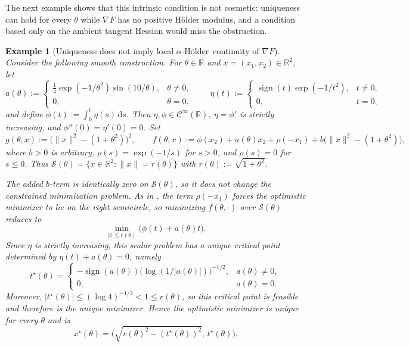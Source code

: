 \documentclass{article}
\theoremstyle{normaltheorem}
\newtheorem{example}[example]{Example}
\newcommand{\R}{\mathbb{R}}
\newcommand{\calS}{\mathcal{S}}
\newcommand{\holder}{{H\"older}}
\begin{document}
The next example shows that this intrinsic condition is not cosmetic: uniqueness can hold for every \(\theta\) while
\(\nabla F\) has no positive H\"older modulus, and a condition based only on the ambient tangent Hessian would miss the
obstruction.

\begin{example}[Uniqueness does not imply local \texorpdfstring{$\alpha$}{alpha}-\holder\ continuity of $\nabla F$]\label{ex:unique-nonsmooth}
Consider the following smooth construction. For $\theta\in\R$ and $x=(x_1,x_2)\in\R^2$, let
\[
a(\theta):=
\begin{cases}
\frac14 \exp({-1/\theta^2})\sin(10/\theta), & \theta\neq 0,\\
0, & \theta=0,
\end{cases}
\qquad
\eta(t):=
\begin{cases}
\operatorname{sign}(t)\exp({-1/t^2}), & t\neq 0,\\
0, & t=0,
\end{cases}
\]
and define $\phi(t):=\int_0^t \eta(s)\,\mathrm ds$. Then $\eta,\phi\in\mathcal{C}^{\infty}(\R)$, $\eta=\phi'$ is strictly increasing, and $\phi''(0)=\eta'(0)=0$. Set
\[
g(\theta,x):=\big(\|x\|^2-(1+\theta^2)\big)^2,
\qquad
f(\theta,x):=\phi(x_2)+a(\theta)x_2+\rho(-x_1)+b\big(\|x\|^2-(1+\theta^2)\big),
\]
where \(b>0\) is arbitrary, $\rho(s)=\exp({-1/s})$ for $s>0$, and $\rho(s)=0$ for $s\le 0$. Thus $\calS(\theta)=\{x\in\R^2:\|x\|=r(\theta)\}$ with $r(\theta):=\sqrt{1+\theta^2}$.

The added \(b\)-term is identically zero on \(\calS(\theta)\), so it does not change the constrained minimization problem.
As in , the term $\rho(-x_1)$ forces the optimistic minimizer to lie on the right semicircle, so minimizing $f(\theta,\cdot)$ over $\calS(\theta)$ reduces to
\[
\min_{|t|\le r(\theta)} \bigl(\phi(t)+a(\theta)t\bigr).
\]
Since $\eta$ is strictly increasing, this scalar problem has a unique critical point determined by $\eta(t)+a(\theta)=0$, namely
\[
t^\star(\theta)=
\begin{cases}
-\operatorname{sign}(a(\theta))\bigl(\log(1/|a(\theta)|)\bigr)^{-1/2}, & a(\theta)\neq 0,\\
0, & a(\theta)=0.
\end{cases}
\]
Moreover, $|t^\star(\theta)|\le(\log 4)^{-1/2}<1\le r(\theta)$, so this critical point is feasible and therefore is the unique minimizer. Hence the optimistic minimizer is unique for every $\theta$ and is
\[
x^\star(\theta)=\bigl(\sqrt{r(\theta)^2-(t^\star(\theta))^2},\,t^\star(\theta)\bigr).
\]


\end{example}
\end{document}
